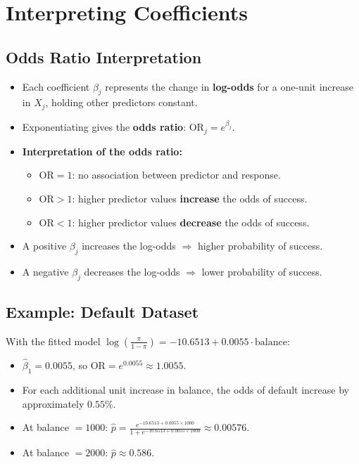 \documentclass{article}
\begin{document}
\section{Interpreting Coefficients}

\subsection{Odds Ratio Interpretation}
\begin{itemize}
    \item Each coefficient $\beta_j$ represents the change in \textbf{log-odds} for a one-unit increase in $X_j$, holding other predictors constant.
    \item Exponentiating gives the \textbf{odds ratio}: $\text{OR}_j = e^{\beta_j}$.
    \item \textbf{Interpretation of the odds ratio:}
    \begin{itemize}
        \item $\text{OR} = 1$: no association between predictor and response.
        \item $\text{OR} > 1$: higher predictor values \textbf{increase} the odds of success.
        \item $\text{OR} < 1$: higher predictor values \textbf{decrease} the odds of success.
    \end{itemize}
    \item A positive $\beta_j$ increases the log-odds $\Rightarrow$ higher probability of success.
    \item A negative $\beta_j$ decreases the log-odds $\Rightarrow$ lower probability of success.
\end{itemize}

\subsection{Example: Default Dataset}
With the fitted model $\log\left(\frac{\pi}{1 - \pi}\right) = -10.6513 + 0.0055 \cdot \text{balance}$:
\begin{itemize}
    \item $\hat{\beta}_1 = 0.0055$, so $\text{OR} = e^{0.0055} \approx 1.0055$.
    \item For each additional unit increase in balance, the odds of default increase by approximately $0.55\%$.
    \item At balance $= 1000$: $\hat{p} = \frac{e^{-10.6513 + 0.0055 \times 1000}}{1 + e^{-10.6513 + 0.0055 \times 1000}} \approx 0.00576$.
    \item At balance $= 2000$: $\hat{p} \approx 0.586$.
\end{itemize}
\end{document}

